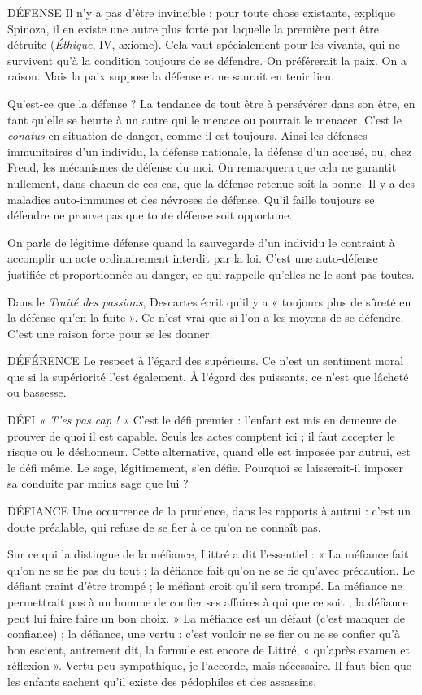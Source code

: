 DÉFENSE Il n’y a pas d’être invincible : pour toute chose existante, explique
Spinoza, il en existe une autre plus forte par laquelle la première
peut être détruite ({\it Éthique}, IV, axiome). Cela vaut spécialement pour les
vivants, qui ne survivent qu’à la condition toujours de se défendre. On préférerait
la paix. On a raison. Mais la paix suppose la défense et ne saurait en tenir
lieu.

Qu'est-ce que la défense ? La tendance de tout être à persévérer dans son
être, en tant qu’elle se heurte à un autre qui le menace ou pourrait le
menacer. C’est le {\it conatus} en situation de danger, comme il est toujours. Ainsi
les défenses immunitaires d’un individu, la défense nationale, la défense d’un
accusé, ou, chez Freud, les mécanismes de défense du moi. On remarquera
que cela ne garantit nullement, dans chacun de ces cas, que la défense retenue
soit la bonne. Il y a des maladies auto-immunes et des névroses de défense.
Qu'il faille toujours se défendre ne prouve pas que toute défense soit opportune.

On parle de légitime défense quand la sauvegarde d’un individu le
contraint à accomplir un acte ordinairement interdit par la loi. C’est une auto-défense
justifiée et proportionnée au danger, ce qui rappelle qu’elles ne le sont
pas toutes.

Dans le {\it Traité des passions}, Descartes écrit qu’il y a « toujours plus de sûreté
en la défense qu’en la fuite ». Ce n’est vrai que si l’on a les moyens de se
défendre. C’est une raison forte pour se les donner.

DÉFÉRENCE Le respect à l'égard des supérieurs. Ce n’est un sentiment moral
que si la supériorité l’est également. À l’égard des puissants,
ce n’est que lâcheté ou bassesse.

DÉFI {\it « T'es pas cap ! »} C’est le défi premier : l’enfant est mis en demeure de
prouver de quoi il est capable. Seuls les actes comptent ici ; il faut
accepter le risque ou le déshonneur. Cette alternative, quand elle est imposée
par autrui, est le défi même. Le sage, légitimement, s’en défie. Pourquoi se laisserait-il
imposer sa conduite par moins sage que lui ?

DÉFIANCE Une occurrence de la prudence, dans les rapports à autrui :
c'est un doute préalable, qui refuse de se fier à ce qu’on ne
connaît pas.

Sur ce qui la distingue de la méfiance, Littré a dit l’essentiel : « La méfiance
fait qu’on ne se fie pas du tout ; la défiance fait qu’on ne se fie qu'avec précaution.
Le défiant craint d’être trompé ; le méfiant croit qu’il sera trompé. La
méfiance ne permettrait pas à un homme de confier ses affaires à qui que ce
soit ; la défiance peut lui faire faire un bon choix. » La méfiance est un défaut
(c’est manquer de confiance) ; la défiance, une vertu : c’est vouloir ne se fier ou
ne se confier qu’à bon escient, autrement dit, la formule est encore de Littré,
« qu'après examen et réflexion ». Vertu peu sympathique, je l'accorde, mais
nécessaire. Il faut bien que les enfants sachent qu’il existe des pédophiles et des
assassins.

